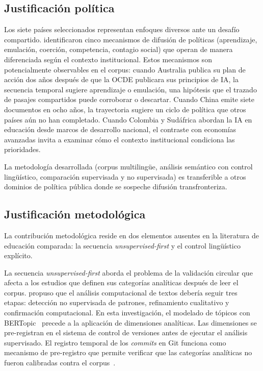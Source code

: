 \subsection{Justificación política}

Los siete países seleccionados representan enfoques diversos ante un desafío compartido. \citet{shipan2012diffusion} identificaron cinco mecanismos de difusión de políticas (aprendizaje, emulación, coerción, competencia, contagio social) que operan de manera diferenciada según el contexto institucional. Estos mecanismos son potencialmente observables en el corpus: cuando Australia publica su plan de acción dos años después de que la OCDE publicara sus principios de IA, la secuencia temporal sugiere aprendizaje o emulación, una hipótesis que el trazado de pasajes compartidos puede corroborar o descartar. Cuando China emite siete documentos en ocho años, la trayectoria sugiere un ciclo de política que otros países aún no han completado. Cuando Colombia y Sudáfrica abordan la IA en educación desde marcos de desarrollo nacional, el contraste con economías avanzadas invita a examinar cómo el contexto institucional condiciona las prioridades.

La metodología desarrollada (corpus multilingüe, análisis semántico con control lingüístico, comparación supervisada y no supervisada) es transferible a otros dominios de política pública donde se sospeche difusión transfronteriza.

\subsection{Justificación metodológica}

La contribución metodológica reside en dos elementos ausentes en la literatura de educación comparada: la secuencia \textit{unsupervised-first} y el control lingüístico explícito.

La secuencia \textit{unsupervised-first} aborda el problema de la validación circular que afecta a los estudios que definen sus categorías analíticas después de leer el corpus. \citet{nelson2020computational} propuso que el análisis computacional de textos debería seguir tres etapas: detección no supervisada de patrones, refinamiento cualitativo y confirmación computacional. En esta investigación, el modelado de tópicos con BERTopic~\citep{grootendorst2022bertopic} precede a la aplicación de dimensiones analíticas. Las dimensiones se pre-registran en el sistema de control de versiones antes de ejecutar el análisis supervisado. El registro temporal de los \textit{commits} en Git funciona como mecanismo de pre-registro que permite verificar que las categorías analíticas no fueron calibradas contra el corpus~\citep{nosek2018preregistration}.

